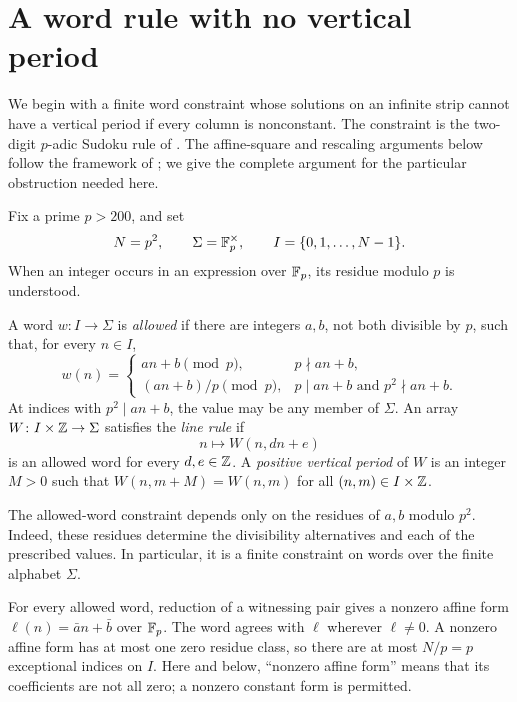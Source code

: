 \section{A word rule with no vertical period}
\label{sec:word}

We begin with a finite word constraint whose solutions on an infinite strip
cannot have a vertical period if every column is nonconstant.  The constraint
is the two-digit $p$-adic Sudoku rule of
\citet[Definition~4.5]{GTUndecidable}.  The affine-square and rescaling
arguments below follow the framework of
\citet[Theorem~4.7, Lemma~4.8, and Section~4.2]{GTUndecidable}; we give the
complete argument for the particular obstruction needed here.

Fix a prime $p>200$, and set
\[
    N=p^2,\qquad \Sigma=\mathbb F_p^\times,
    \qquad I=\{0,1,\ldots,N-1\}.
\]
When an integer occurs in an expression over $\mathbb F_p$, its residue modulo $p$
is understood.

\begin{definition}
\label{word:definition}
A word $w\colon I\to\Sigma$ is \emph{allowed} if there are integers $a,b$,
not both divisible by $p$, such that, for every $n\in I$,
\[
 w(n)=
 \begin{cases}
   an+b\pmod p, & p\nmid an+b,\\[2pt]
   (an+b)/p\pmod p, & p\mid an+b\text{ and }p^2\nmid an+b.
 \end{cases}
\]
At indices with $p^2\mid an+b$, the value may be any member of $\Sigma$.
An array $W\colon I\times\mathbb Z\to\Sigma$ satisfies the \emph{line rule} if
\[
    n\longmapsto W(n,dn+e)
\]
is an allowed word for every $d,e\in\mathbb Z$.
A \emph{positive vertical period} of $W$ is an integer $M>0$ such that
$W(n,m+M)=W(n,m)$ for all $(n,m)\in I\times\mathbb Z$.
\end{definition}

The allowed-word constraint depends only on the residues of $a,b$ modulo
$p^2$.  Indeed, these residues determine the divisibility alternatives
and each of the prescribed values.  In particular, it is a finite
constraint on words over the finite alphabet $\Sigma$.

For every allowed word, reduction of a witnessing pair gives a nonzero
affine form $\ell(n)=\bar a n+\bar b$ over $\mathbb F_p$.  The word agrees with
$\ell$ wherever $\ell\ne0$.  A nonzero affine form has at most one zero
residue class, so there are at most $N/p=p$ exceptional indices on $I$.
Here and below, ``nonzero affine form'' means that its coefficients are
not all zero; a nonzero constant form is permitted.

